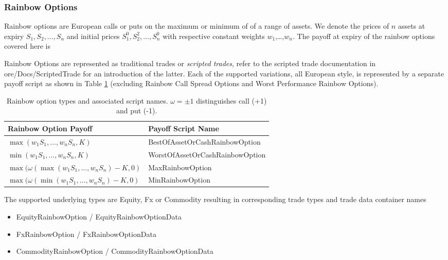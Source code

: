\subsubsection{Rainbow Options}
\label{sec:rainbowoption}


Rainbow options are European calls or puts on the maximum or minimum of
of a range of assets. We denote the prices of $n$ assets at expiry $S_1, S_2,\ldots,
S_n$ and initial prices $S_1^0, S_2^2,\ldots,S_n^0$ with respective constant
weights $w_1$,\ldots,$w_n$. The payoff at expiry of the rainbow options covered here is

Rainbow Options are represented as traditional trades or {\em scripted trades}, refer to the scripted trade documentation in ore/Docs/ScriptedTrade
for an introduction of the latter. Each of the supported variations, all European style, is represented by a separate
payoff script as shown in Table \ref{tab:rainbowoptions} (excluding Rainbow Call Spread Options and Worst Performance Rainbow Options).

\begin{table}[hbt]
\begin{center}
\begin{tabular}{|l|l|}
\hline
Rainbow Option Payoff & Payoff Script Name \\
\hline
\hline
$\max(w_1 S_1,\ldots, w_n S_n, K)$ & BestOfAssetOrCashRainbowOption \\
\hline
$\min(w_1 S_1,\ldots, w_n S_n, K)$ & WorstOfAssetOrCashRainbowOption \\
\hline
$\max(\omega(\max(w_1 S_1,\ldots, w_n S_n) - K, 0)$ & MaxRainbowOption  \\
\hline
$\max(\omega(\min(w_1 S_1,\ldots, w_n S_n) - K, 0)$ & MinRainbowOption  \\
\hline
\end{tabular}
\end{center}
\caption{Rainbow option types and associated script names. $\omega=\pm 1$ distinguishes call (+1) and put (-1).}
\label{tab:rainbowoptions}
\end{table}

The supported underlying types are Equity, Fx or Commodity resulting in corresponding trade types and trade data
container names

\begin{itemize}
  \item EquityRainbowOption / EquityRainbowOptionData
  \item FxRainbowOption / FxRainbowOptionData
  \item CommodityRainbowOption / CommodityRainbowOptionData
\end{itemize}

